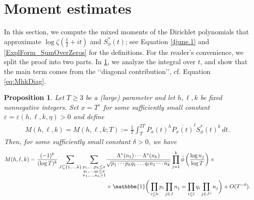 \documentclass[12pt,oneside,english,a4paper]{amsart}
\newtheorem{prop}[thm]{Proposition}
\theoremstyle{remark}
\numberwithin{equation}{section}
\newcommand{\Starphi}{S_\phi^*}
\begin{document}
\section{Moment estimates}\label{SectionMomentEstimates}

In this section, we compute the mixed moments of the Dirichlet polynomials that approximate $\log\zeta(\frac12+it)$ and $\Starphi(t)$; see Equation \eqref{4june.1} and \cref{ExplForm_SumOverZeros} for the definitions. For the reader's convenience, we split the proof into two parts. In \cref{prop:lkmoments}, we analyze the integral over $t$, and show that the main term comes from the \lq\lq diagonal contribution\rq\rq, cf. Equation \eqref{eq:MhkDiag}.

\begin{prop}\label{prop:lkmoments}
    Let $T \ge 3$ be a (large) parameter and let $h,\ell,k$ be fixed nonnegative integers. Set $x = T^{\varepsilon}$ for some sufficiently small constant $\varepsilon = \varepsilon(h,\ell,k,\eta) > 0$ and define 
    \begin{align*}
           M(h,\ell,k) = M(h, \ell,k; T) := \frac{1}{T}\int_T^{2 T} P_x(t)^{h} \overline{P_x(t)}^{\ell} \Starphi(t)^k\, dt.
    \end{align*}
    Then, for some sufficiently small constant $\delta>0$, we have
    \begin{equation}\begin{split}\label{eq:MhkDiag}
        M(h,\ell, k) = \frac{(-1)^k}{(\log T)^k} 
        \sum_{J \subseteq \{1, \dots, k \}} \sum_{\substack{p_1, \dots, p_h\leq x\\
        q_1, \dots, q_\ell\leq x\\ n_1, \dots, n_k \ge 1 }} &\frac{\Lambda^*(n_1) \cdots \Lambda^*(n_k)}{\sqrt{p_1\cdots p_h q_1\dots q_\ell n_1 \cdots n_k}} \prod_{j=1}^k  \hat\phi\left(\frac{\log n_j}{\log T}\right) \times \\
        &\times\mathbbm{1} \bigg( \prod_{i\leq h} p_i \prod_{j \in J} n_j = \prod_{i\leq \ell} q_i \prod_{j\in J^c} n_j \bigg) + O (T^{-\delta}).
    \end{split}\end{equation}
\end{prop}
\end{document}

